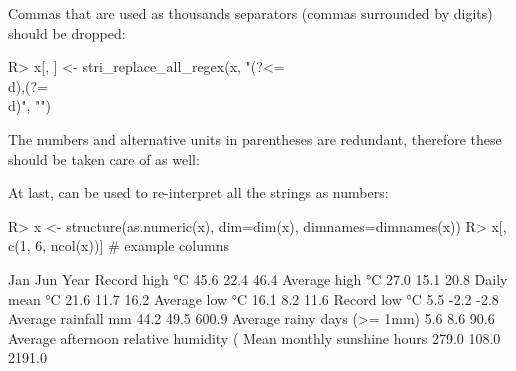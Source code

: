 \documentclass[nojss]{jss}
\begin{document}
Commas that are used as thousands separators (commas surrounded
by digits) should be dropped:

\begin{Schunk}
\begin{Sinput}
R> x[, ] <- stri_replace_all_regex(x, "(?<=\\d),(?=\\d)", "")
\end{Sinput}
\end{Schunk}

The numbers and alternative units in parentheses are redundant,
therefore these should be taken care of as well:

\begin{Schunk}
\end{Schunk}

At last,  can be used to re-interpret all the strings
as numbers:

\begin{Schunk}
\begin{Sinput}
R> x <- structure(as.numeric(x), dim=dim(x), dimnames=dimnames(x))
R> x[, c(1, 6, ncol(x))]  # example columns
\end{Sinput}
\begin{Soutput}
                                          Jan   Jun   Year
Record high °C                           45.6  22.4   46.4
Average high °C                          27.0  15.1   20.8
Daily mean °C                            21.6  11.7   16.2
Average low °C                           16.1   8.2   11.6
Record low °C                             5.5  -2.2   -2.8
Average rainfall mm                      44.2  49.5  600.9
Average rainy days (>= 1mm)               5.6   8.6   90.6
Average afternoon relative humidity (%)  47.0  61.0   51.0
Mean monthly sunshine hours             279.0 108.0 2191.0
\end{Soutput}
\end{Schunk}
\end{document}
